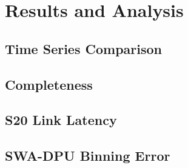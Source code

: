 \chapter{Results and Analysis}
\label{chapterlabel3}

\blindtext

\section{Time Series Comparison}
\blindtext

\section{Completeness}
\blindtext

\section{S20 Link Latency}
\blindtext

\section{SWA-DPU Binning Error}
\blindtext